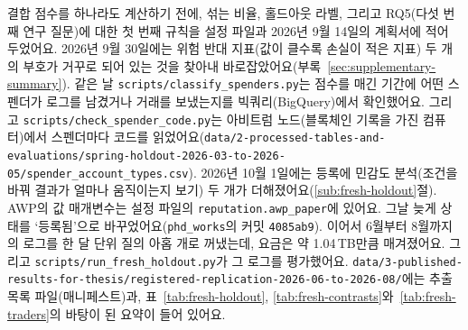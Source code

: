결합 점수를 하나라도 계산하기 전에, 섞는 비율, 홀드아웃 라벨, 그리고 RQ5(다섯 번째 연구 질문)에 대한 첫 번째 규칙을 설정 파일과 2026년 9월 14일의 계획서에 적어 두었어요. 2026년 9월 30일에는 위험 반대 지표(값이 클수록 손실이 적은 지표) 두 개의 부호가 거꾸로 되어 있는 것을 찾아내 바로잡았어요(부록~\ref{sec:supplementary-summary}). 같은 날 \texttt{scripts/classify\_spenders.py}는 점수를 매긴 기간에 어떤 스펜더가 로그를 남겼거나 거래를 보냈는지를 빅쿼리(BigQuery)에서 확인했어요. 그리고 \texttt{scripts/check\_spender\_code.py}는 아비트럼 노드(블록체인 기록을 가진 컴퓨터)에서 스펜더마다 코드를 읽었어요(\texttt{data/2-processed-tables-and-evaluations/spring-holdout-2026-03-to-2026-05/spender\_account\_types.csv}). 2026년 10월 1일에는 등록에 민감도 분석(조건을 바꿔 결과가 얼마나 움직이는지 보기) 두 개가 더해졌어요(\ref{sub:fresh-holdout}절). AWP의 값 매개변수는 설정 파일의 \texttt{reputation.awp\_paper}에 있어요. 그날 늦게 상태를 ‘등록됨’으로 바꾸었어요(\texttt{phd\_works}의 커밋 \texttt{4085ab9}). 이어서 6월부터 8월까지의 로그를 한 달 단위 질의 아홉 개로 꺼냈는데, 요금은 약 1.04\,TB만큼 매겨졌어요. 그리고 \texttt{scripts/run\_fresh\_holdout.py}가 그 로그를 평가했어요. \texttt{data/3-published-results-for-thesis/registered-replication-2026-06-to-2026-08/}에는 추출 목록 파일(매니페스트)과, 표~\ref{tab:fresh-holdout}, \ref{tab:fresh-contrasts}와~\ref{tab:fresh-traders}의 바탕이 된 요약이 들어 있어요.

